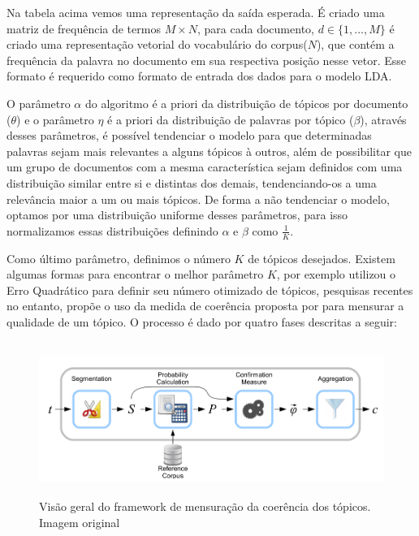 \documentclass[12pt,a4paper]{article}
\begin{document}
  
  Na tabela acima vemos uma representação da saída esperada. É criado uma matriz de frequência de termos $M \times N$, para cada documento,
   $d \in \{1,. . . , M\}$ é criado uma representação vetorial do vocabulário do corpus($N$), que contém a frequência da palavra no documento em sua respectiva posição nesse vetor.
   Esse formato é requerido como formato de entrada dos dados para o modelo LDA.
  
  O parâmetro $\alpha$ do algoritmo é a priori da distribuição de tópicos por documento ($\theta$) e o parâmetro $\eta$ é a priori da distribuição de palavras por tópico ($\beta$),
   através desses parâmetros, é possível tendenciar o modelo para que determinadas palavras sejam mais relevantes a alguns tópicos à outros,
   além de possibilitar que um grupo de documentos com a mesma característica sejam definidos com uma distribuição similar entre si e distintas dos demais,
   tendenciando-os a uma relevância maior a um ou mais tópicos. De forma a não tendenciar o modelo, optamos por uma distribuição uniforme desses parâmetros,
   para isso normalizamos essas distribuições definindo $\alpha$ e $\beta$ como $\frac{1}{K}$.
  
  Como último parâmetro, definimos o número $K$ de tópicos desejados. Existem algumas formas para encontrar o melhor parâmetro $K$,
    por exemplo utilizou o Erro Quadrático para definir seu número otimizado de tópicos, pesquisas recentes no entanto,
   propõe o uso da medida de coerência proposta por  para mensurar a qualidade de um tópico. O processo é dado por quatro fases descritas a seguir:
  
  
  \begin{figure}[H]
    \centering
      \includegraphics[height=5cm]{images/figure_3.png}
      \caption{Visão geral do framework de mensuração da coerência dos tópicos. Imagem original }
  \end{figure}
  
\end{document}

